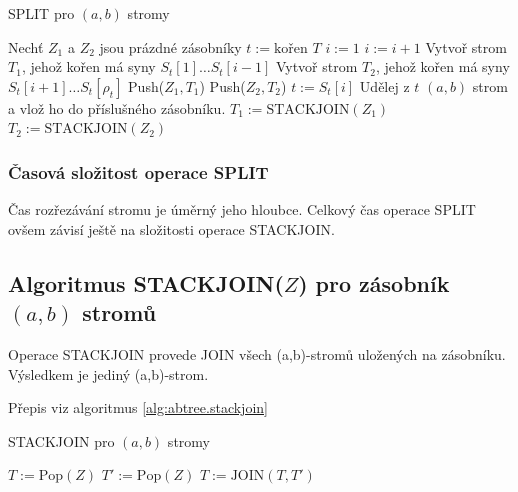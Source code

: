 \begin{algorithm}[!htb]
\caption{SPLIT pro $(a,b)$ stromy}
\label{alg:abtree.split}
\begin{algorithmic}
\STATE Nechť $Z_1$ a $Z_2$ jsou prázdné zásobníky
\STATE $t := \text{kořen } T$
	\STATE $i := 1$
		\STATE $i := i + 1$ 
	\ENDWHILE
	\STATE Vytvoř strom $T_1$, jehož kořen %
	má syny $S_t[1] \dots S_t[i-1]$
	\STATE Vytvoř strom $T_2$, jehož kořen %
	má syny $S_t[i+1] \dots S_t[\rho_t]$
		\STATE Push($Z_1, T_1$)
	\ENDIF
		\STATE Push($Z_2, T_2$)
	\ENDIF
	\STATE $t := S_t[i]$ 
\ENDWHILE
{}
	\STATE Udělej z $t$ $(a,b)$ strom a vlož ho
	do příslušného zásobníku.
\ENDIF
\STATE $T_1 := \text{STACKJOIN}(Z_1)$ 
\STATE $T_2 := \text{STACKJOIN}(Z_2)$
\end{algorithmic}
\end{algorithm}

\subsubsection{Časová složitost operace SPLIT}

Čas rozřezávání stromu je úměrný jeho hloubce. Celkový čas operace
SPLIT ovšem závisí ještě na složitosti operace STACKJOIN.

\subsection{Algoritmus STACKJOIN($Z$) pro zásobník $(a,b)$ stromů}
\label{abtrees.stackjoin}

Operace STACKJOIN provede JOIN všech (a,b)-stromů uložených na zásobníku.
Výsledkem je jediný (a,b)-strom.

Přepis viz algoritmus \ref{alg:abtree.stackjoin}

\begin{algorithm}[!htb]
\caption{STACKJOIN pro $(a,b)$ stromy}
\label{alg:abtree.stackjoin}
\begin{algorithmic}
\STATE $T := \text{Pop}(Z)$
	\STATE $T' := \text{Pop}(Z)$
	\STATE $T := \text{JOIN}(T, T')$
\ENDWHILE
\end{algorithmic}
\end{algorithm}

